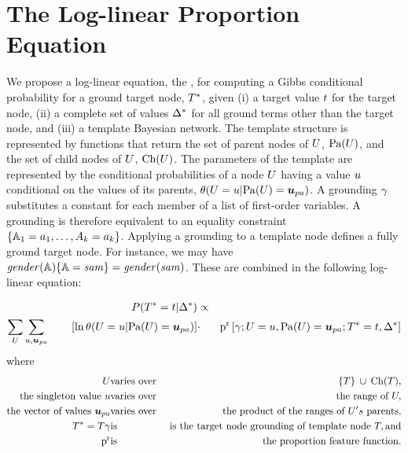 \documentclass[runningheads,a4paper]{llncs}
\renewcommand{\Qconj}{\Appendterm{\FG{\TT} = \TV} {\QC}} %
\newcommand{\fixneeded}[1]{\textbf{[\footnotesize #1]}}
\begin{document}
\section{The Log-linear Proportion Equation} 
\label{sec:theequation}

We propose a log-linear equation, the , for computing a Gibbs conditional probability for a ground target node, $T^{*}\hspace{0.0ex}$, given (i) a target value $t$ for the target node, (ii) a complete set of values $\Delta^{*}\hspace{0.0ex}$  for all ground terms other than the target node, and (iii) a template Bayesian network. The template structure is represented by functions that return the set of parent nodes of $U$, $\mathrm{Pa}(U)$, and the set of child nodes of $U$, $\mathrm{Ch}(U)$. The parameters of the template are
represented by the conditional probabilities of a node $U$ having a value $u$ conditional on the values of its parents, $\cprob{\UT = \UV}{\Pa{\UT} = \Prange{\UT}}$. A grounding $\gamma$ substitutes a constant for each member of a list of first-order variables. A grounding is therefore equivalent to an equality constraint $\{\mathbb{A}_{1} = a_{1},\ldots, A_{k} = a_{k}\}$. Applying a grounding to a template node defines a fully ground target node. For instance, we may have $\it{gender}(\mathbb{A}) \{\mathbb{A} = sam\} = \it{gender}(sam)$.  These are combined in the following log-linear equation:

%

\begin{definition}\label{def:log-diff-freq-eq}
\begin{eqnarray*}
  \Gprob{\FG{{\TT}} = \TV} {\QC} &\propto &  \\
 \sum_{\UT} \sum_{\UV,\Prange{\UT}}   \qquad \left[ \ln \cprob{\UT = \UV}{\Pa{\UT} = \Prange{\UT}} \right] &
    \cdot &
    \Relfreq{\Appendterm{\grounding;\UT  = \UV} {\Pa{\UT} = \Prange{\UT}}} {\Qconj}
\end{eqnarray*}
where 
\begin{eqnarray*}
\UT &\mathrm{varies\ over} & \Setaddterm{\{\TT\}} {\Ch{\TT}}, \\
\mbox{the singleton value} \ \UV & \mathrm{varies\ over} & \mbox{the range of}\  \UT,\\
\mbox{the vector of values} \ \Prange{\UT} & \mathrm{varies\ over} & \mbox{the product of the ranges of} \ \UT's\ \mbox{parents}, \\
\FG{\TT} = \TT \grounding&\mathrm{is} & \mbox{ is the target node grounding of template node }  \TT, \mathrm{and} \\
\Relevant{\Fvar} &\mathrm{is} & \mbox{the proportion feature function}.
\end{eqnarray*}
\end{definition}
\end{document}

